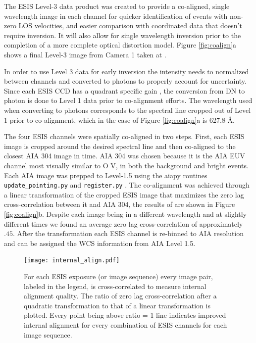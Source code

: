         The ESIS Level-3 data product was created to provide a co-aligned, single wavelength image in each channel for quicker identification of events with non-zero LOS velocities, and easier comparison with coordinated data that doesn't require inversion. 
        It will also allow for single wavelength inversion prior to the completion of a more complete optical distortion model.
        Figure \ref{fig:coalign}a shows a final Level-3 image from Camera 1 taken at \levthreetime.
        
        In order to use Level 3 data for early inversion the intensity needs to normalized between channels and converted to photons to properly account for uncertainty.
        Since each ESIS CCD has a quadrant specific gain \citep{ESIS}, the conversion from DN to photon is done to Level 1 data prior to co-alignment efforts.
        The wavelength used when converting to photons corresponds to the spectral line cropped out of Level 1 prior to co-alignment, which in the case of Figure \ref{fig:coalign}a is 627.8 \AA. 
        
        The four ESIS channels were spatially co-aligned in two steps.  
        First, each ESIS image is cropped around the desired spectral line and then co-aligned to the closest AIA 304 image in time.  
        AIA 304 was chosen because it is the AIA EUV channel most visually similar to O V, in both the background and bright events.
        Each AIA image was prepped to Level-1.5 using the aiapy routines \texttt{update\_pointing.py} and \texttt{register.py} \citep{aiapy}.
        The co-alignment was achieved through a linear transformation of the cropped ESIS image that maximizes the zero lag cross-correlation between it and AIA 304, the results of are shown in Figure \ref{fig:coalign}b.
        Despite each image being in a different wavelength and at slightly different times we found an average zero lag cross-correlation of approximately $.45$.
        After the transformation each ESIS channel is re-binned to AIA resolution and can be assigned the WCS information from AIA Level 1.5.
        
        \begin{figure}
        	\centering
        	\texttt{[image: internal\_align.pdf]}
        	\caption{For each ESIS exposure (or image sequence) every image pair, labeled in the legend, is cross-correlated to measure internal alignment quality.  The ratio of zero lag cross-correlation after a quadratic transformation to that of a linear transformation is plotted.  Every point being above ratio = 1 line indicates improved internal alignment for every combination of ESIS channels for each image sequence. }
        	\label{fig:cc}
        \end{figure}
        
